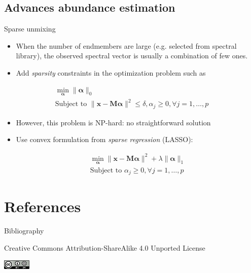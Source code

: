 \documentclass[10pt,aspectratio=1610]{beamer}
\begin{document}
\subsection{Advances abundance estimation}
\label{sec:org6287cdc}
\begin{frame}[label={sec:org8a136af}]{Sparse unmixing}
\begin{itemize}
\item When the number of endmembers are large (e.g. selected from spectral
library), the observed  spectral vector is usually  a combination of
few ones.
\item Add \emph{sparsity} constraints in the optimization problem such as
\end{itemize}
\begin{center}
  \begin{eqnarray*}
    \min_{\boldsymbol{\alpha}} \|\boldsymbol{\alpha}\|_{0} \\
    \text{Subject to } \|\mathbf{x}-\mathbf{M}\boldsymbol{\alpha}\|^2 \leq \delta, \alpha_j\geq 0, \forall j=1,\ldots,p
  \end{eqnarray*}
\end{center}
\begin{itemize}
\item However, this problem is NP-hard: no straightforward solution
\item Use convex formulation from \emph{sparse regression} (LASSO):
\begin{center}
\begin{eqnarray*}
\min_{\boldsymbol{\alpha}} \|\mathbf{x}-\mathbf{M}\boldsymbol{\alpha}\|^2  + \lambda \|\boldsymbol{\alpha}\|_{1}\\
\text{Subject to }\alpha_j\geq 0, \forall j=1,\ldots,p
\end{eqnarray*}
\end{center}
\end{itemize}
\end{frame}
\section{References}
\label{sec:orgfe3b32b}
\begin{frame}[fragile,allowframebreaks,label=]{Bibliography}
\printbibliography
\end{frame}
\begin{frame}[label={sec:orga8bc9d5}]{}
\begin{center}
\tiny Creative Commons Attribution-ShareAlike 4.0 Unported License
\normalsize

\begin{center}
\includegraphics[width=0.1\textwidth]{figures/cc-by-sa.png}
\end{center}
\end{center}
\end{frame}
\end{document}
